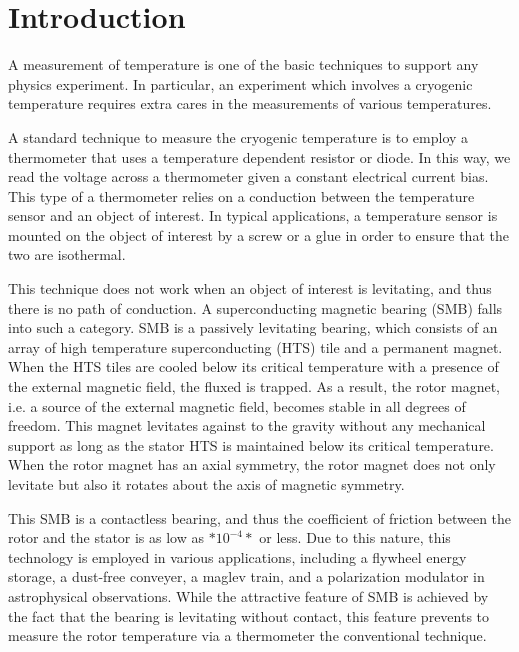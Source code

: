 \section{Introduction}

A measurement of temperature is one of the basic techniques to support any physics experiment. 
In particular, an experiment which involves a cryogenic temperature requires extra cares in the measurements of various temperatures.

A standard technique to measure the cryogenic temperature is to employ a thermometer that uses a temperature dependent resistor or diode. 
In this way, we read the voltage across a thermometer given a constant electrical current bias. 
This type of a thermometer relies on a conduction between the temperature sensor and an object of interest. 
In typical applications, a temperature sensor is mounted on the object of interest by a screw or a glue in order to ensure that the two are isothermal. 

This technique does not work when an object of interest is levitating, and thus there is no path of conduction. 
A superconducting magnetic bearing (SMB) falls into such a category. 
SMB is a passively levitating bearing, which consists of an array of high temperature superconducting (HTS) tile and a permanent magnet. 
When the HTS tiles are cooled below its critical temperature with a presence of the external magnetic field, the fluxed is trapped. 
As a result, the rotor magnet, i.e. a source of the external magnetic field, becomes stable in all degrees of freedom. 
This magnet levitates against to the gravity without any mechanical support as long as the stator HTS is maintained below its critical temperature. 
When the rotor magnet has an axial symmetry, the rotor magnet does not only levitate but also it rotates about the axis of magnetic symmetry. 

This SMB is a contactless bearing, and thus the coefficient of friction between the rotor and the stator is as low as $*10^{-4}*$ or less. 
Due to this nature, this technology is employed in various applications, including a flywheel energy storage, a dust-free conveyer, a maglev train, and a polarization modulator in astrophysical observations.
While the attractive feature of SMB is achieved by the fact that the bearing is levitating without contact, this feature prevents to measure the rotor temperature via a thermometer the conventional technique. 


